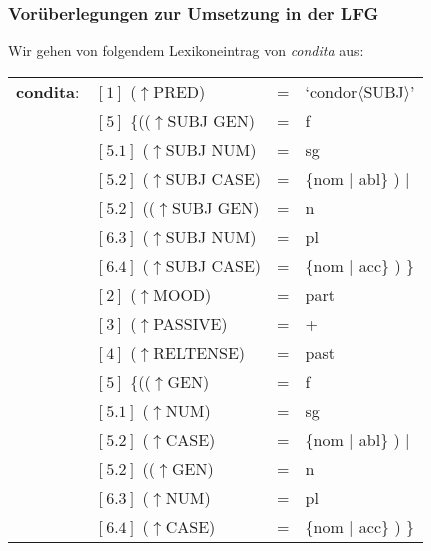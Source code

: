 \documentclass[12pt,a4paper]{article}
\begin{document}
\subsubsection{Vorüberlegungen zur Umsetzung in der LFG}
Wir gehen von folgendem Lexikoneintrag von \textit{condita} aus:
\begin{singlespace}
\begin{tabular}{ l  l  l  l  } 
\textbf{condita}: & $[1]$ \:  ($\uparrow$PRED) & = & `condor$\langle$SUBJ$\rangle$'\\
$\qquad$ & $[5]$ \:  \{(($\uparrow$SUBJ GEN) & = & f \\ 
$\qquad$ & $[5.1]$ \:  ($\uparrow$SUBJ NUM) & = & sg \\
$\qquad$ & $[5.2]$ \:  ($\uparrow$SUBJ CASE) & = & \{nom $\mid$ abl\} ) $\mid$\\
$\qquad$ & $[5.2]$ \: (($\uparrow$SUBJ GEN) & = & n \\
$\qquad$ & $[6.3]$ \:  ($\uparrow$SUBJ NUM) & = & pl \\
$\qquad$ & $[6.4]$ \:  ($\uparrow$SUBJ CASE) & = & \{nom $\mid$ acc\} ) \}\\
$\qquad$ & $[2]$ \:  ($\uparrow$MOOD) & = & part\\
$\qquad$ & $[3]$ \:  ($\uparrow$PASSIVE) & = & + \\
$\qquad$ & $[4]$ \:  ($\uparrow$RELTENSE) & = & past \\
$\qquad$ & $[5]$ \:  \{(($\uparrow$GEN) & = & f \\ 
$\qquad$ & $[5.1]$ \:  ($\uparrow$NUM) & = & sg \\
$\qquad$ & $[5.2]$ \:  ($\uparrow$CASE) & = & \{nom $\mid$ abl\} ) $\mid$\\
$\qquad$ & $[5.2]$ \: (($\uparrow$GEN) & = & n \\
$\qquad$ & $[6.3]$ \:  ($\uparrow$NUM) & = & pl \\
$\qquad$ & $[6.4]$ \:  ($\uparrow$CASE) & = & \{nom $\mid$ acc\} ) \}\\
\end{tabular}
\newline
\newline
\end{singlespace}
\end{document}
